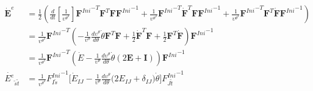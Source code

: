 \documentclass[oneside,11pt,times]{book}
\begin{document}
\begin{equation}
\begin{aligned}
\dot{\boldsymbol{E}}^e&=\frac{1}{2}\left(\frac{d}{dt}\left[\frac{1}{\upsilon^{{\theta}^2}}\right]{\bm{F}^{Ini}}^{-T}{\bm{F}}^T\bm{F}{\bm{F}^{Ini}}^{-1}+\frac{1}{\upsilon^{{\theta}^2}}{\bm{F}^{Ini}}^{-T}\dot{\bm{F}}^T\bm{F}{\bm{F}^{Ini}}^{-1}+\frac{1}{\upsilon^{{\theta}^2}}{\bm{F}^{Ini}}^{-T}{\bm{F}}^T\dot{\bm{F}}{\bm{F}^{Ini}}^{-1} \right)\\
&=\frac{1}{\upsilon^{{\theta}^2}}{\bm{F}^{Ini}}^{-T}\left(-\frac{1}{\upsilon^{\theta}}\frac{d\upsilon^{\theta}}{d\theta}\dot{\theta}{\bm{F}}^T\bm{F}+\frac{1}{2}\dot{\bm{F}}^T\bm{F}+\frac{1}{2}{\bm{F}}^T\dot{\bm{F}} \right){\bm{F}^{Ini}}^{-1}\\
&=\frac{1}{\upsilon^{{\theta}^2}}{\bm{F}^{Ini}}^{-T}\left(\dot{E}-\frac{1}{\upsilon^{\theta}}\frac{d\upsilon^{\theta}}{d\theta}\dot{\theta}\left(2{\bm{E}}+\bm{I}\right) \right){\bm{F}^{Ini}}^{-1}\\\dot{{E}^e}_{\tilde{s}\tilde{t}} &=\frac{1}{\upsilon^{{\theta}^2}}{{F}^{Ini}_{I\tilde{s}}}^{-1}\Bigg[{\dot{E}_{IJ}}-\frac{1}{\upsilon^{\theta}}\frac{d\upsilon^{\theta}}{d\theta}\bigg(2{E}_{IJ}+\delta_{IJ}\bigg)\dot{\theta}\Bigg]{{F}^{Ini}_{J\tilde{t}}}^{-1}
\end{aligned}
\end{equation}
\end{document}
